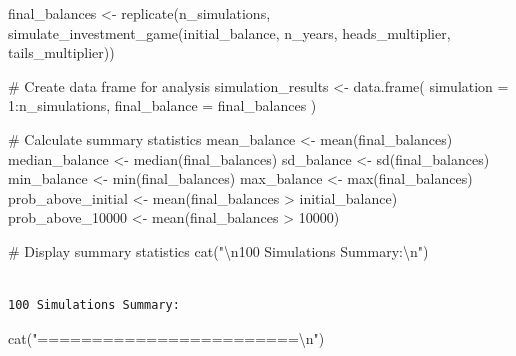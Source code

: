 \documentclass[
  letterpaper,
  DIV=11,
  numbers=noendperiod]{scrartcl}
\newenvironment{Shaded}{\begin{snugshade}}{\end{snugshade}}
\newcommand{\AttributeTok}[1]{\textcolor[rgb]{0.40,0.45,0.13}{#1}}
\newcommand{\CommentTok}[1]{\textcolor[rgb]{0.37,0.37,0.37}{#1}}
\newcommand{\DecValTok}[1]{\textcolor[rgb]{0.68,0.00,0.00}{#1}}
\newcommand{\FunctionTok}[1]{\textcolor[rgb]{0.28,0.35,0.67}{#1}}
\newcommand{\NormalTok}[1]{\textcolor[rgb]{0.00,0.23,0.31}{#1}}
\newcommand{\OtherTok}[1]{\textcolor[rgb]{0.00,0.23,0.31}{#1}}
\newcommand{\SpecialCharTok}[1]{\textcolor[rgb]{0.37,0.37,0.37}{#1}}
\newcommand{\StringTok}[1]{\textcolor[rgb]{0.13,0.47,0.30}{#1}}
\begin{document}
\begin{Shaded}
\begin{Highlighting}[]
\NormalTok{final\_balances }\OtherTok{\textless{}{-}} \FunctionTok{replicate}\NormalTok{(n\_simulations, }
  \FunctionTok{simulate\_investment\_game}\NormalTok{(initial\_balance, n\_years, heads\_multiplier, tails\_multiplier))}

\CommentTok{\# Create data frame for analysis}
\NormalTok{simulation\_results }\OtherTok{\textless{}{-}} \FunctionTok{data.frame}\NormalTok{(}
  \AttributeTok{simulation =} \DecValTok{1}\SpecialCharTok{:}\NormalTok{n\_simulations,}
  \AttributeTok{final\_balance =}\NormalTok{ final\_balances}
\NormalTok{)}

\CommentTok{\# Calculate summary statistics}
\NormalTok{mean\_balance }\OtherTok{\textless{}{-}} \FunctionTok{mean}\NormalTok{(final\_balances)}
\NormalTok{median\_balance }\OtherTok{\textless{}{-}} \FunctionTok{median}\NormalTok{(final\_balances)}
\NormalTok{sd\_balance }\OtherTok{\textless{}{-}} \FunctionTok{sd}\NormalTok{(final\_balances)}
\NormalTok{min\_balance }\OtherTok{\textless{}{-}} \FunctionTok{min}\NormalTok{(final\_balances)}
\NormalTok{max\_balance }\OtherTok{\textless{}{-}} \FunctionTok{max}\NormalTok{(final\_balances)}
\NormalTok{prob\_above\_initial }\OtherTok{\textless{}{-}} \FunctionTok{mean}\NormalTok{(final\_balances }\SpecialCharTok{\textgreater{}}\NormalTok{ initial\_balance)}
\NormalTok{prob\_above\_10000 }\OtherTok{\textless{}{-}} \FunctionTok{mean}\NormalTok{(final\_balances }\SpecialCharTok{\textgreater{}} \DecValTok{10000}\NormalTok{)}

\CommentTok{\# Display summary statistics}
\FunctionTok{cat}\NormalTok{(}\StringTok{"}\SpecialCharTok{\textbackslash{}n}\StringTok{100 Simulations Summary:}\SpecialCharTok{\textbackslash{}n}\StringTok{"}\NormalTok{)}
\end{Highlighting}
\end{Shaded}

\begin{verbatim}

100 Simulations Summary:
\end{verbatim}

\begin{Shaded}
\begin{Highlighting}[]
\FunctionTok{cat}\NormalTok{(}\StringTok{"========================}\SpecialCharTok{\textbackslash{}n}\StringTok{"}\NormalTok{)}
\end{Highlighting}
\end{Shaded}
\end{document}
